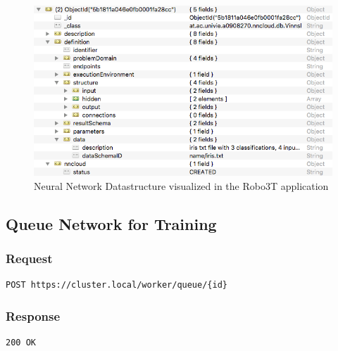 \begin{figure}
\centering
\includegraphics[width=12.00000cm]{images/usecase_1_datastructure}
\caption[Neural Network Datastructure visualized in the Robo3T
application \label{usecase_1_datastructure}]{Neural Network
Datastructure visualized in the Robo3T\footnotemark{} application
\label{usecase_1_datastructure}}
\end{figure}

\subsection{Queue Network for
Training}\label{queue-network-for-training}

\subsubsection{Request}\label{request-2}

\begin{verbatim}
POST https://cluster.local/worker/queue/{id}
\end{verbatim}

\subsubsection{Response}\label{response-2}

\begin{verbatim}
200 OK
\end{verbatim}

